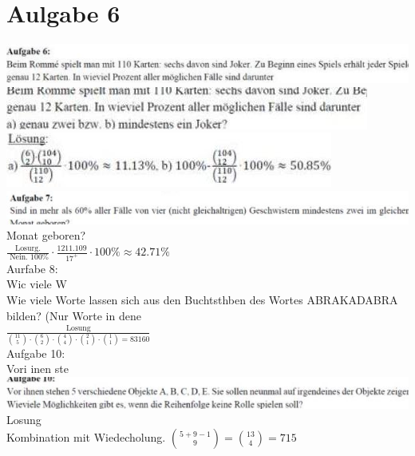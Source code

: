 \documentclass[10pt]{article}
\begin{document}
\section*{Aulgabe 6}
\includegraphics[width=\linewidth]{images/2024_12_29_0906b02acf849bda8665g-3(16)}\\
\includegraphics[width=\linewidth]{images/2024_12_29_0906b02acf849bda8665g-3(14)}\\
\includegraphics[width=\linewidth]{images/2024_12_29_0906b02acf849bda8665g-3(18)}\\
\includegraphics[width=\linewidth]{images/2024_12_29_0906b02acf849bda8665g-3(19)} Monat geboren?\\
$\frac{\text { Losurg. }}{\text { Nein. } 100 \%} \cdot \frac{1211.109}{17^{+}} \cdot 100 \% \approx 42.71 \%$\\
Aurfabe 8:\\
Wic viele W\\
Wie viele Worte lassen sich aus den Buchtsthben des Wortes ABRAKADABRA bilden? (Nur Worte in dene\\
$\frac{\text { Losung }}{\binom{11}{5} \cdot\binom{6}{2} \cdot\binom{4}{4} \cdot\binom{2}{1} \cdot\binom{1}{1}=83160}$\\
Aufgabe 10:\\
Vori inen ste\\
\includegraphics[width=\linewidth]{images/2024_12_29_0906b02acf849bda8665g-3(6)}\\
Losung\\
Kombination mit Wiedecholung. $\binom{5+9-1}{9}=\binom{13}{4}=715$\\
\end{document}

